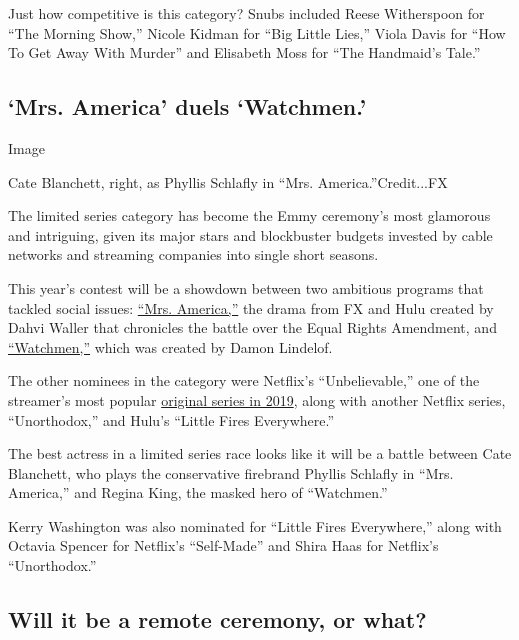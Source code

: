 Just how competitive is this category? Snubs included Reese Witherspoon
for ``The Morning Show,'' Nicole Kidman for ``Big Little Lies,'' Viola
Davis for ``How To Get Away With Murder'' and Elisabeth Moss for ``The
Handmaid's Tale.''

\hypertarget{mrs-america-duels-watchmen}{%
\subsection{`Mrs. America' duels
`Watchmen.'}\label{mrs-america-duels-watchmen}}

Image

Cate Blanchett, right, as Phyllis Schlafly in ``Mrs.
America.''Credit...FX

The limited series category has become the Emmy ceremony's most
glamorous and intriguing, given its major stars and blockbuster budgets
invested by cable networks and streaming companies into single short
seasons.

This year's contest will be a showdown between two ambitious programs
that tackled social issues:
\href{https://www.nytimes3xbfgragh.onion/2020/04/14/arts/television/mrs-america-review.html}{``Mrs.
America,''} the drama from FX and Hulu created by Dahvi Waller that
chronicles the battle over the Equal Rights Amendment, and
\href{https://www.nytimes3xbfgragh.onion/2019/12/16/arts/television/watchmen-finale.html}{``Watchmen,''}
which was created by Damon Lindelof.

The other nominees in the category were Netflix's ``Unbelievable,'' one
of the streamer's most popular
\href{https://www.nytimes3xbfgragh.onion/2019/10/17/business/media/netflix-top-ten-movies-tv-shows.html}{original
series in 2019}, along with another Netflix series, ``Unorthodox,'' and
Hulu's ``Little Fires Everywhere.''

The best actress in a limited series race looks like it will be a battle
between Cate Blanchett, who plays the conservative firebrand Phyllis
Schlafly in ``Mrs. America,'' and Regina King, the masked hero of
``Watchmen.''

Kerry Washington was also nominated for ``Little Fires Everywhere,''
along with Octavia Spencer for Netflix's ``Self-Made'' and Shira Haas
for Netflix's ``Unorthodox.''

\hypertarget{will-it-be-a-remote-ceremony-or-what}{%
\subsection{Will it be a remote ceremony, or
what?}\label{will-it-be-a-remote-ceremony-or-what}}

